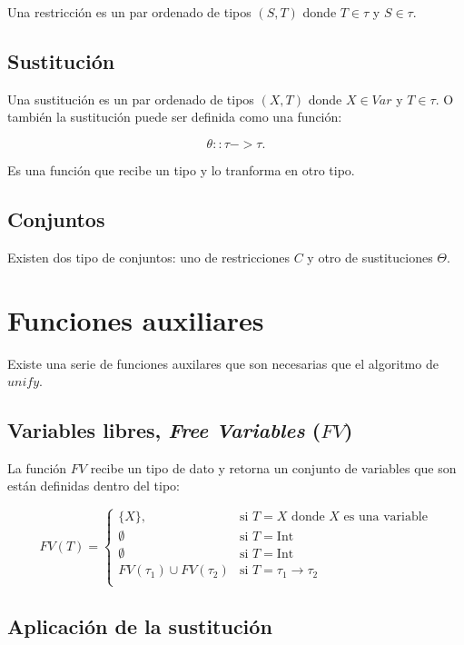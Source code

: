 \documentclass{article}
\begin{document}
Una restricción es un par ordenado de tipos $(S,T)$ donde $T \in \tau$
y $S \in \tau$.

\subsection{Sustitución}
\label{sec:estrsust}

Una sustitución es un par ordenado de tipos $(X,T)$ donde $X \in Var$ y
$T \in \tau$. O también la sustitución puede ser definida como una
función:

\[
  \theta :: \tau -> \tau.
\]

Es una función que recibe un tipo y lo tranforma en otro tipo.

\subsection{Conjuntos}
\label{sec:conjuntos}

Existen dos tipo de conjuntos: uno de restricciones $C$ y otro de
sustituciones $\Theta$.


\section{Funciones auxiliares}
\label{sec:funaux}

Existe una serie de funciones auxilares que son necesarias que el
algoritmo de $unify$.

\subsection{Variables libres, \emph{Free Variables} ($FV$) }
\label{sec:fv}

La función $FV$ recibe un tipo de dato y retorna un conjunto de
variables que son están definidas dentro del tipo:

\[
  FV(T) =
  \begin{cases}
    \{X\}, & \text{si $T = X$ donde $X$ es una variable} \\
    \emptyset & \text{si $T = \text{Int}$} \\
    \emptyset & \text{si $T = \text{Int}$} \\
    FV(\tau_1) \cup FV(\tau_2) & \text{si $T = \tau_1 \to \tau_2$} \\
  \end{cases}
\]

\subsection{Aplicación de la sustitución}
\label{sec:aplsus}
\end{document}
